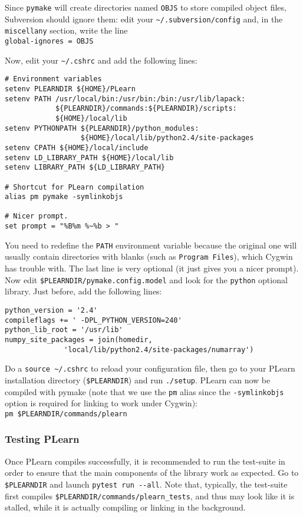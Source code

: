 \documentclass[11pt]{book}
\begin{document}
Since \verb!pymake! will create directories named \verb!OBJS! to store
compiled object files, Subversion should ignore them: edit
your \verb!~/.subversion/config! and, in the \verb!miscellany! section,
write the line\\
\verb!global-ignores = OBJS!

Now, edit your \verb!~/.cshrc! and add the following lines:

\begin{verbatim}
# Environment variables
setenv PLEARNDIR ${HOME}/PLearn
setenv PATH /usr/local/bin:/usr/bin:/bin:/usr/lib/lapack:
            ${PLEARNDIR}/commands:${PLEARNDIR}/scripts:
            ${HOME}/local/lib
setenv PYTHONPATH ${PLEARNDIR}/python_modules:
                  ${HOME}/local/lib/python2.4/site-packages
setenv CPATH ${HOME}/local/include
setenv LD_LIBRARY_PATH ${HOME}/local/lib
setenv LIBRARY_PATH ${LD_LIBRARY_PATH}

# Shortcut for PLearn compilation
alias pm pymake -symlinkobjs

# Nicer prompt.
set prompt = "%B%m %~%b > "
\end{verbatim}

You need to redefine the \verb!PATH! environment variable because the
original one will usually contain directories with blanks (such as
\verb!Program Files!), which Cygwin has trouble with.
The last line is very optional (it just gives you a nicer prompt).
Now edit \verb!$PLEARNDIR/pymake.config.model! and look for the
\verb!python! optional library.
Just before, add the following lines:
\begin{verbatim}
python_version = '2.4'
compileflags += ' -DPL_PYTHON_VERSION=240'
python_lib_root = '/usr/lib'
numpy_site_packages = join(homedir,
              'local/lib/python2.4/site-packages/numarray')
\end{verbatim}

Do a \verb!source ~/.cshrc! to reload your configuration file, then go
to your PLearn installation directory (\verb!$PLEARNDIR!) and run \verb!./setup!. PLearn can now be compiled
with pymake (note that we use the \verb!pm! alias since the \verb!-symlinkobjs!
option is required for linking to work under Cygwin):\\
\verb!pm $PLEARNDIR/commands/plearn!

\subsubsection{Testing PLearn}

Once PLearn compiles successfully, it is recommended to run the test-suite
in order to ensure that the main components of the library work as expected.
Go to \verb!$PLEARNDIR! and launch \verb!pytest run --all!.
Note that, typically, the test-suite first compiles \verb!$PLEARNDIR/commands/plearn_tests!,
and thus may look like it is stalled, while it is actually compiling or linking
in the background.
\end{document}
